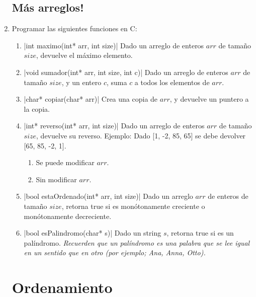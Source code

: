 \documentclass[titlepage,oneside]{book}
\begin{document}
\begin{enumerate}
    \subsection{Más arreglos!}

    \item Programar las siguientes funciones en C:
    \begin{enumerate}
        \item{}|int maximo(int* arr, int size)|
        Dado un arreglo de enteros $arr$ de tamaño $size$, devuelve el máximo elemento.

        \item{}|void sumador(int* arr, int size, int c)|
        Dado un arreglo de enteros $arr$ de tamaño $size$, y un entero $c$, suma $c$ a todos los elementos de $arr$.

        \item{}|char* copiar(char* arr)|
        Crea una copia de $arr$, y devuelve un puntero a la copia.
        
        \item{}|int* reverso(int* arr, int size)|
        Dado un arreglo de enteros $arr$ de tamaño $size$, devuelve su reverso. \newline
        Ejemplo: Dado [1, -2, 85, 65] se debe devolver [65, 85, -2, 1].
        \begin{enumerate}
            \item Se puede modificar $arr$.
            \item Sin modificar $arr$.
        \end{enumerate}

        \item{}|bool estaOrdenado(int* arr, int size)|
        Dado un arreglo $arr$ de enteros de tamaño $size$, retorna true si es monótonamente creciente o monótonamente decreciente.

        \item{}|bool esPalindromo(char* s)|
        Dado un string $s$, retorna true si es un palíndromo. \textit{Recuerden que un palíndromo es una palabra que se lee igual en un sentido que en otro (por ejemplo; Ana, Anna, Otto).}
    \end{enumerate}

    \section{Ordenamiento}


\end{enumerate}
\end{document}

